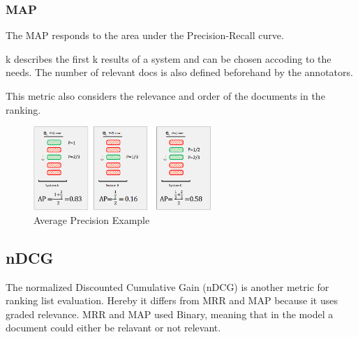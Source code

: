 \documentclass[
../../NLP4W_Summary.tex,
]
{subfiles}
\begin{document}
\subsubsection{MAP}
\begin{defbox}
    The MAP responds to the area under the Precision-Recall curve.
    \begin{center}
        \begin{smallmathbox*}
        \end{smallmathbox*}
        k describes the first k results of a system and can be chosen accoding to the needs. The number of relevant docs is also defined beforehand by the annotators.
    \end{center}
    This metric also considers the relevance and order of the documents in the ranking.
\end{defbox}

\begin{figure}
    [htp]
    \centering
    \includegraphics[width=0.6\textwidth]{Pics/MAPExample.png}
    \caption{Average Precision Example}
\end{figure}

\subsection{nDCG}

The normalized Discounted Cumulative Gain (nDCG) is another metric for ranking list evaluation. 
Hereby it differs from MRR and MAP because it uses graded relevance. MRR and MAP used Binary, meaning that in the model a document could either be relavant or not relevant. 
\end{document}
